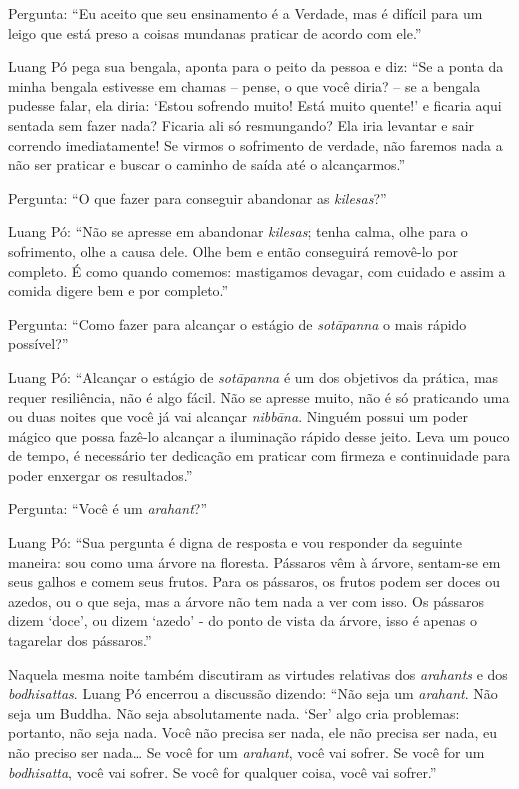 Pergunta: ``Eu aceito que seu ensinamento é a Verdade, mas é difícil
para um leigo que está preso a coisas mundanas praticar de acordo com
ele.''

Luang Pó pega sua bengala, aponta para o peito da pessoa e diz: ``Se a
ponta da minha bengala estivesse em chamas -- pense, o que você diria?
-- se a bengala pudesse falar, ela diria: `Estou sofrendo muito! Está
muito quente!' e ficaria aqui sentada sem fazer nada? Ficaria ali só
resmungando? Ela iria levantar e sair correndo imediatamente! Se virmos
o sofrimento de verdade, não faremos nada a não ser praticar e buscar o
caminho de saída até o alcançarmos.''

Pergunta: ``O que fazer para conseguir abandonar as \emph{kilesas}?''

Luang Pó: ``Não se apresse em abandonar \emph{kilesas}; tenha calma,
olhe para o sofrimento, olhe a causa dele. Olhe bem e então conseguirá
removê-lo por completo. É como quando comemos: mastigamos devagar, com
cuidado e assim a comida digere bem e por completo.''

Pergunta: ``Como fazer para alcançar o estágio de \emph{sotāpanna} o
mais rápido possível?''

Luang Pó: ``Alcançar o estágio de \emph{sotāpanna} é um dos objetivos da
prática, mas requer resiliência, não é algo fácil. Não se apresse muito,
não é só praticando uma ou duas noites que você já vai alcançar
\emph{nibbāna}. Ninguém possui um poder mágico que possa fazê-lo
alcançar a iluminação rápido desse jeito. Leva um pouco de tempo, é
necessário ter dedicação em praticar com firmeza e continuidade para
poder enxergar os resultados.''

Pergunta: ``Você é um \emph{arahant}?''

Luang Pó: ``Sua pergunta é digna de resposta e vou responder da seguinte
maneira: sou como uma árvore na floresta. Pássaros vêm à árvore,
sentam-se em seus galhos e comem seus frutos. Para os pássaros, os
frutos podem ser doces ou azedos, ou o que seja, mas a árvore não tem
nada a ver com isso. Os pássaros dizem `doce', ou dizem `azedo' - do
ponto de vista da árvore, isso é apenas o tagarelar dos pássaros.''

Naquela mesma noite também discutiram as virtudes relativas dos
\emph{arahants} e dos \emph{bodhisattas}. Luang Pó encerrou a discussão
dizendo: ``Não seja um \emph{arahant}. Não seja um Buddha. Não seja
absolutamente nada. `Ser' algo cria problemas: portanto, não seja nada.
Você não precisa ser nada, ele não precisa ser nada, eu não preciso ser
nada\ldots{} Se você for um \emph{arahant}, você vai sofrer. Se você for
um \emph{bodhisatta}, você vai sofrer. Se você for qualquer coisa, você
vai sofrer.''

